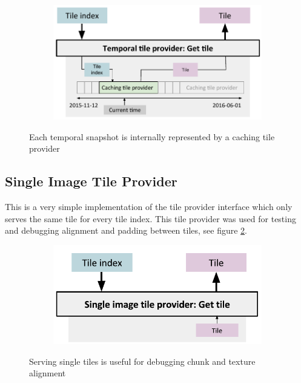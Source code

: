 \begin{figure}[htbp]
    \centering
    \begin{subfigure}[bt]{0.7\textwidth}
        \includegraphics[width=\textwidth]{figures/implementation/tileprovider/temporaltileprovider_gettile.pdf}
    \end{subfigure}
    \caption{Each temporal snapshot is internally represented by a caching tile provider}
    \label{fig:temporaltileprovider_gettile}
\end{figure}


\subsection{Single Image Tile Provider}
This is a very simple implementation of the tile provider interface which only serves the same tile for every tile index. This tile provider was used for testing and debugging alignment and padding between tiles, see figure \ref{fig:singleimagetileprovider_gettile}.

\begin{figure}[htbp]
    \centering
    \begin{subfigure}[bt]{0.5\textwidth}
        \includegraphics[width=\textwidth]{figures/implementation/tileprovider/singleimagetileprovider_gettile.pdf}
    \end{subfigure}
    \caption{Serving single tiles is useful for debugging chunk and texture alignment}
    \label{fig:singleimagetileprovider_gettile}
\end{figure}


